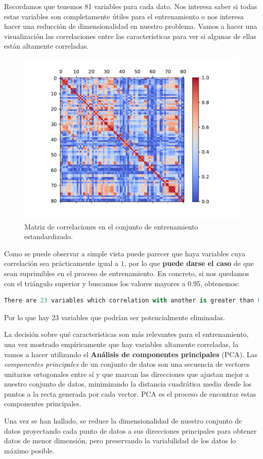 \documentclass[a4paper, 20pt]{article}
\begin{document}
Recordamos que tenemos 81 variables para cada dato. Nos interesa saber si todas estas variables son completamente útiles para el entrenamiento o nos interesa hacer una reducción de dimensionalidad en nuestro problema. Vamos a hacer una visualización las correlaciones entre las características para ver si algunas de ellas están altamente correladas.

\begin{figure}[H]
  \centering
  \includegraphics[width=0.55\linewidth]{media/corr-normalized.pdf}
  \caption{Matriz de correlaciones en el conjunto de entrenamiento estandardizado. }
  \label{fig:myfig:2}
\end{figure}

Como se puede observar a simple vista puede parecer que haya variables cuya correlación sea prácticamente igual a $1$, por lo que \textbf{puede darse el caso} de que sean suprimibles en el proceso de entrenamiento. En concreto, si nos quedamos con el triángulo superior y buscamos los valores mayores a $0.95$, obtenemos:
\begin{lstlisting}[language = Python]
  There are 23 variables which correlation with another is greater than 0.95
\end{lstlisting}
Por lo que hay 23 variables que podrían ser potencialmente eliminadas. 

La decisión sobre qué características son más relevantes para el entrenamiento, una vez mostrado empíricamente que hay variables altamente correladas, la vamos a hacer utilizando el \textbf{Análisis de componentes principales} (PCA).  Las \emph{componentes principales} de un conjunto de datos son una secuencia de vectores unitarios ortogonales entre sí y que marcan las direcciones que ajustan mejor a nuestro conjunto de datos, minimizando la distancia cuadrática media desde los puntos a la recta generada por cada vector. PCA es el proceso de encontrar estas componentes principales.

Una vez se han hallado, se reduce la dimensionalidad de nuestro conjunto de datos proyectando cada punto de datos a sus direcciones principales para obtener datos de menor dimensión, pero preservando la variabilidad de los datos lo máximo posible.
\end{document}
